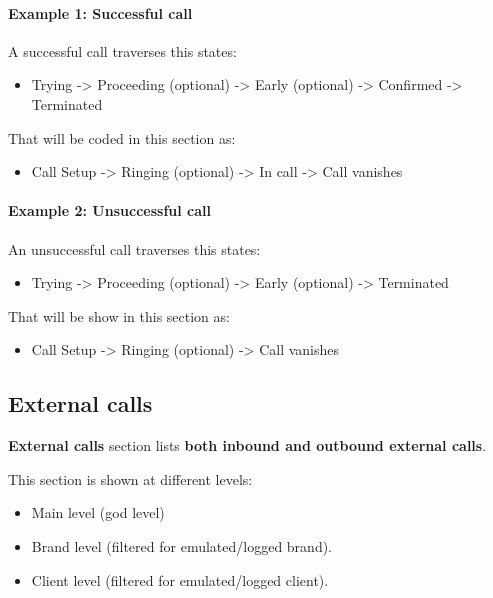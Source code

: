 \documentclass[letterpaper,10pt,english]{sphinxmanual}
\begin{document}
\paragraph{Example 1: Successful call}

A successful call traverses this states:
\begin{itemize}
\item {} 
Trying -\textgreater{} Proceeding (optional) -\textgreater{} Early (optional) -\textgreater{} Confirmed -\textgreater{} Terminated

\end{itemize}

That will be coded in this section as:
\begin{itemize}
\item {} 
Call Setup -\textgreater{} Ringing (optional) -\textgreater{} In call -\textgreater{} Call vanishes

\end{itemize}
\paragraph{Example 2: Unsuccessful call}

An unsuccessful call traverses this states:
\begin{itemize}
\item {} 
Trying -\textgreater{} Proceeding (optional) -\textgreater{} Early (optional) -\textgreater{} Terminated

\end{itemize}

That will be show in this section as:
\begin{itemize}
\item {} 
Call Setup -\textgreater{} Ringing (optional) -\textgreater{} Call vanishes

\end{itemize}


\subsection{External calls}
\label{administration_portal/brand/calls/external_calls:id1}\label{administration_portal/brand/calls/external_calls::doc}\label{administration_portal/brand/calls/external_calls:external-calls}
\textbf{External calls} section lists \textbf{both inbound and outbound external calls}.

This section is shown at different levels:
\begin{itemize}
\item {} 
Main level (god level)

\item {} 
Brand level (filtered for emulated/logged brand).

\item {} 
Client level (filtered for emulated/logged client).

\end{itemize}
\end{document}

